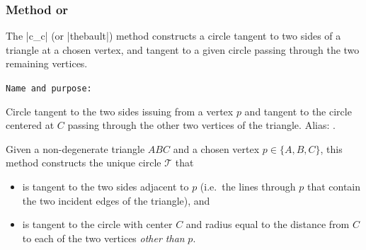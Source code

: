 \begin{tkzexample}[latex=6cm]
\begin{center}
\end{center}
\end{tkzexample}



\subsubsection{Method  or  }
\label{ssub:method_triangle_c_c}

The |c_c| (or |thebault|) method constructs a circle tangent to two sides of a triangle at a chosen vertex, and tangent to a given circle passing through the two remaining vertices.

\medskip
\texttt{Name and purpose: }

Circle tangent to the two sides issuing from a vertex $p$ and tangent to the circle centered at $C$ passing through the other two vertices of the triangle.
Alias: .

Given a non-degenerate triangle $ABC$ and a chosen vertex $p\in\{A,B,C\}$, this method constructs the unique circle $\mathcal{T}$ that
\begin{itemize}
  \item is tangent to the two sides adjacent to $p$ (i.e.\ the lines through $p$ that contain the two incident edges of the triangle), and
  \item is tangent to the circle with center $C$ and radius equal to the distance from \(C\) to each of the two vertices \emph{other than} $p$.
\end{itemize}

